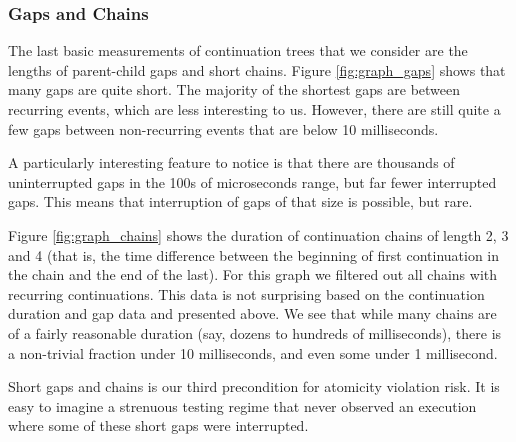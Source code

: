\documentclass[acmsmall,anonymous,review]{acmart}\settopmatter{printfolios=true,printccs=false,printacmref=false}
\begin{document}
\subsubsection{Gaps and Chains}

The last basic measurements of continuation trees that we consider are the lengths of parent-child gaps and short chains.
Figure \ref{fig:graph_gaps} shows that many gaps are quite short.
The majority of the shortest gaps are between recurring events, which are less interesting to us.
However, there are still quite a few gaps between non-recurring events that are below 10 milliseconds.

A particularly interesting feature to notice is that there are thousands of uninterrupted gaps in the 100s of microseconds range, but far fewer interrupted gaps.
This means that interruption of gaps of that size is possible, but rare.

Figure \ref{fig:graph_chains} shows the duration of continuation chains of length 2, 3 and 4 (that is, the time difference between the beginning of first continuation in the chain and the end of the last).
For this graph we filtered out all chains with recurring continuations.
This data is not surprising based on the continuation duration and gap data and presented above.
We see that while many chains are of a fairly reasonable duration (say, dozens to hundreds of milliseconds), there is a non-trivial fraction under 10 milliseconds, and even some under 1 millisecond.

Short gaps and chains is our third precondition for atomicity violation risk.
It is easy to imagine a strenuous testing regime that never observed an execution where some of these short gaps were interrupted.
\end{document}
